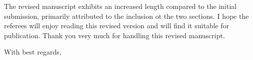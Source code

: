 \documentclass[10pt,a4paper]{letter}
\begin{document}
\begin{letter}{}
The revised manuscript exhibits an increased length compared to the initial submission, primarily attributed to the inclusion ot the two sections. 
I hope the referees will enjoy reading this revised version and will find it suitable for publication. 
Thank you very much for handling this revised manuscript.


\closing{
With best regards,}
\end{letter}
\end{document}
